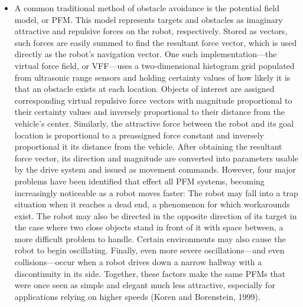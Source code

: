\documentclass[12pt]{report}
\begin{document}
\begin{itemize}
\item{A common traditional method of obstacle avoidance is the potential field model, or PFM.  This model represents targets and obstacles as imaginary attractive and repulsive forces on the robot, respectively.  Stored as vectors, such forces are easily summed to find the resultant force vector, which is used directly as the robot's navigation vector.  One such implementation---the virtual force field, or VFF---uses a two-dimensional histogram grid populated from ultrasonic range sensors and holding certainty values of how likely it is that an obstacle exists at each location.  Objects of interest are assigned corresponding virtual repulsive force vectors with magnitude proportional to their certainty values and inversely proportional to their distance from the vehicle's center.  Similarly, the attractive force between the robot and its goal location is proportional to a preassigned force constant and inversely proportional it its distance from the vehicle.  After obtaining the resultant force vector, its direction and magnitude are converted into parameters usable by the drive system and issued as movement commands.  However, four major problems have been identified that effect all PFM systems, becoming increasingly noticeable as a robot moves faster:  The robot may fall into a trap situation when it reaches a dead end, a phenomenon for which workarounds exist.  The robot may also be directed in the opposite direction of its target in the case where two close objects stand in front of it with space between, a more difficult problem to handle.  Certain environments may also cause the robot to begin oscillating.  Finally, even more severe oscillations---and even collisions---occur when a robot drives down a narrow hallway with a discontinuity in its side.  Together, these factors make the same PFMs that were once seen as simple and elegant much less attractive, especially for applications relying on higher speeds (Koren and Borenstein, 1999).}

\end{itemize}
\end{document}
